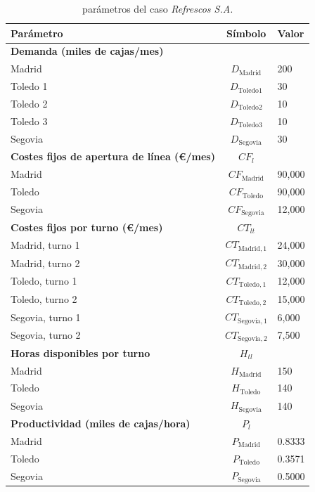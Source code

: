 \begin{table}[!h]
\centering
\caption{parámetros del caso \textit{Refrescos S.A.}}
\begin{tabular}{lcl}
\toprule
\textbf{Parámetro} & \textbf{Símbolo} & \textbf{Valor} \\
\midrule
\textbf{Demanda (miles de cajas/mes)} & & \\
\quad Madrid & $D_{\text{Madrid}}$ & 200 \\
\quad Toledo 1 & $D_{\text{Toledo1}}$ & 30 \\
\quad Toledo 2 & $D_{\text{Toledo2}}$ & 10 \\
\quad Toledo 3 & $D_{\text{Toledo3}}$ & 10 \\
\quad Segovia & $D_{\text{Segovia}}$ & 30 \\
\midrule
\textbf{Costes fijos de apertura de línea (€/mes)} & $CF_l$ & \\
\quad Madrid & $CF_{\text{Madrid}}$ & 90{,}000 \\
\quad Toledo & $CF_{\text{Toledo}}$ & 90{,}000 \\
\quad Segovia & $CF_{\text{Segovia}}$ & 12{,}000 \\
\midrule
\textbf{Costes fijos por turno (€/mes)} & $CT_{lt}$ & \\
\quad Madrid, turno 1 & $CT_{\text{Madrid},1}$ & 24{,}000 \\
\quad Madrid, turno 2 & $CT_{\text{Madrid},2}$ & 30{,}000 \\
\quad Toledo, turno 1 & $CT_{\text{Toledo},1}$ & 12{,}000 \\
\quad Toledo, turno 2 & $CT_{\text{Toledo},2}$ & 15{,}000 \\
\quad Segovia, turno 1 & $CT_{\text{Segovia},1}$ & 6{,}000 \\
\quad Segovia, turno 2 & $CT_{\text{Segovia},2}$ & 7{,}500 \\
\midrule
\textbf{Horas disponibles por turno} & $H_{tl}$ & \\
\quad Madrid & $H_{\text{Madrid}}$ & 150 \\
\quad Toledo & $H_{\text{Toledo}}$ & 140 \\
\quad Segovia & $H_{\text{Segovia}}$ & 140 \\
\midrule
\textbf{Productividad (miles de cajas/hora)} & $P_l$ & \\
\quad Madrid & $P_{\text{Madrid}}$ & 0.8333 \\
\quad Toledo & $P_{\text{Toledo}}$ & 0.3571 \\
\quad Segovia & $P_{\text{Segovia}}$ & 0.5000 \\

\end{tabular}
\end{table}
